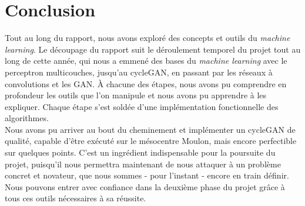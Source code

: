 \chapter*{Conclusion}


Tout au long du rapport, nous avons exploré des concepts et outils du \textit{machine learning}. Le découpage du rapport suit le déroulement temporel du projet tout au long de cette année, qui nous a emmené des bases du \textit{machine learning} avec le perceptron multicouches, jusqu’au cycleGAN, en passant par les réseaux à convolutions et les GAN. À chacune des étapes, nous avons pu comprendre en profondeur les outils que l'on manipule et nous avons pu apprendre à les expliquer. Chaque étape s'est soldée d'une implémentation fonctionnelle des algorithmes.\\
Nous avons pu arriver au bout du cheminement et implémenter un cycleGAN de qualité, capable d'être exécuté sur le mésocentre Moulon, mais encore perfectible sur quelques points. C'est un ingrédient indispensable pour la poursuite du projet, puisqu’il nous permettra maintenant de nous attaquer à un problème concret et novateur, que nous sommes - pour l'instant - encore en train définir. Nous pouvons entrer avec confiance dans la deuxième phase du projet grâce à tous ces outils nécessaires à sa réussite.